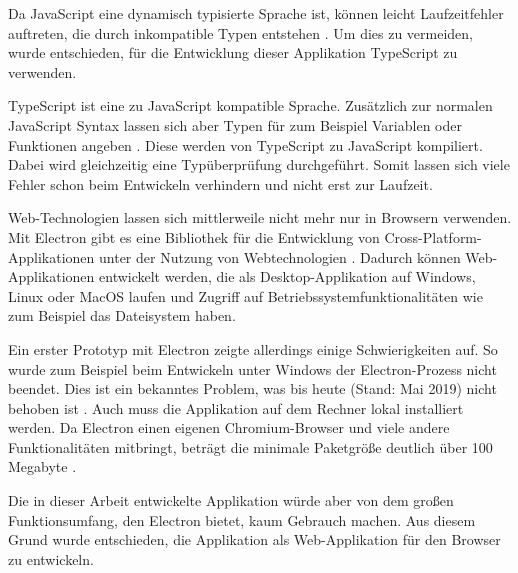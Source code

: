 Da JavaScript eine dynamisch typisierte Sprache ist, können leicht Laufzeitfehler auftreten, die durch inkompatible Typen entstehen \cite{mdn:javascript}. Um dies zu vermeiden, wurde entschieden, für die Entwicklung dieser Applikation TypeScript zu verwenden.

TypeScript ist eine zu JavaScript kompatible Sprache. Zusätzlich zur normalen JavaScript Syntax lassen sich aber Typen für zum Beispiel Variablen oder Funktionen angeben \cite{typescript:mainpage}. Diese werden von TypeScript zu JavaScript kompiliert. Dabei wird gleichzeitig eine Typüberprüfung durchgeführt. Somit lassen sich viele Fehler schon beim Entwickeln verhindern und nicht erst zur Laufzeit.

Web-Technologien lassen sich mittlerweile nicht mehr nur in Browsern verwenden. Mit Electron gibt es eine Bibliothek für die Entwicklung von Cross-Platform-Applikationen unter der Nutzung von Webtechnologien \cite{electron:about}. Dadurch können Web-Applikationen entwickelt werden, die als Desktop-Applikation auf Windows, Linux oder MacOS laufen und Zugriff auf Betriebssystemfunktionalitäten wie zum Beispiel das Dateisystem haben.

Ein erster Prototyp mit Electron zeigte allerdings einige Schwierigkeiten auf. So wurde zum Beispiel beim Entwickeln unter Windows der Electron-Prozess nicht beendet. Dies ist ein bekanntes Problem, was bis heute (Stand: Mai 2019) nicht behoben ist \cite{electron:processissue}. Auch muss die Applikation auf dem Rechner lokal installiert werden. Da Electron einen eigenen Chromium-Browser und viele andere Funktionalitäten mitbringt, beträgt die minimale Paketgröße deutlich über 100 Megabyte \cite{electron:sizeissue}.

Die in dieser Arbeit entwickelte Applikation würde aber von dem großen Funktionsumfang, den Electron bietet, kaum Gebrauch machen. Aus diesem Grund wurde entschieden, die Applikation als Web-Applikation für den Browser zu entwickeln.



